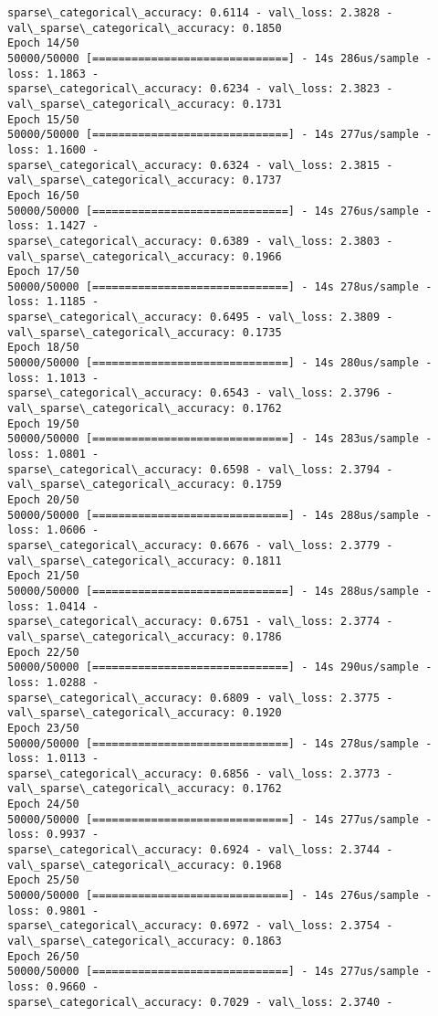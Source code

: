 \documentclass[11pt]{article}
\begin{document}
\begin{Verbatim}[commandchars=\\\{\}]
sparse\_categorical\_accuracy: 0.6114 - val\_loss: 2.3828 -
val\_sparse\_categorical\_accuracy: 0.1850
Epoch 14/50
50000/50000 [==============================] - 14s 286us/sample - loss: 1.1863 -
sparse\_categorical\_accuracy: 0.6234 - val\_loss: 2.3823 -
val\_sparse\_categorical\_accuracy: 0.1731
Epoch 15/50
50000/50000 [==============================] - 14s 277us/sample - loss: 1.1600 -
sparse\_categorical\_accuracy: 0.6324 - val\_loss: 2.3815 -
val\_sparse\_categorical\_accuracy: 0.1737
Epoch 16/50
50000/50000 [==============================] - 14s 276us/sample - loss: 1.1427 -
sparse\_categorical\_accuracy: 0.6389 - val\_loss: 2.3803 -
val\_sparse\_categorical\_accuracy: 0.1966
Epoch 17/50
50000/50000 [==============================] - 14s 278us/sample - loss: 1.1185 -
sparse\_categorical\_accuracy: 0.6495 - val\_loss: 2.3809 -
val\_sparse\_categorical\_accuracy: 0.1735
Epoch 18/50
50000/50000 [==============================] - 14s 280us/sample - loss: 1.1013 -
sparse\_categorical\_accuracy: 0.6543 - val\_loss: 2.3796 -
val\_sparse\_categorical\_accuracy: 0.1762
Epoch 19/50
50000/50000 [==============================] - 14s 283us/sample - loss: 1.0801 -
sparse\_categorical\_accuracy: 0.6598 - val\_loss: 2.3794 -
val\_sparse\_categorical\_accuracy: 0.1759
Epoch 20/50
50000/50000 [==============================] - 14s 288us/sample - loss: 1.0606 -
sparse\_categorical\_accuracy: 0.6676 - val\_loss: 2.3779 -
val\_sparse\_categorical\_accuracy: 0.1811
Epoch 21/50
50000/50000 [==============================] - 14s 288us/sample - loss: 1.0414 -
sparse\_categorical\_accuracy: 0.6751 - val\_loss: 2.3774 -
val\_sparse\_categorical\_accuracy: 0.1786
Epoch 22/50
50000/50000 [==============================] - 14s 290us/sample - loss: 1.0288 -
sparse\_categorical\_accuracy: 0.6809 - val\_loss: 2.3775 -
val\_sparse\_categorical\_accuracy: 0.1920
Epoch 23/50
50000/50000 [==============================] - 14s 278us/sample - loss: 1.0113 -
sparse\_categorical\_accuracy: 0.6856 - val\_loss: 2.3773 -
val\_sparse\_categorical\_accuracy: 0.1762
Epoch 24/50
50000/50000 [==============================] - 14s 277us/sample - loss: 0.9937 -
sparse\_categorical\_accuracy: 0.6924 - val\_loss: 2.3744 -
val\_sparse\_categorical\_accuracy: 0.1968
Epoch 25/50
50000/50000 [==============================] - 14s 276us/sample - loss: 0.9801 -
sparse\_categorical\_accuracy: 0.6972 - val\_loss: 2.3754 -
val\_sparse\_categorical\_accuracy: 0.1863
Epoch 26/50
50000/50000 [==============================] - 14s 277us/sample - loss: 0.9660 -
sparse\_categorical\_accuracy: 0.7029 - val\_loss: 2.3740 -

\end{Verbatim}
\end{document}
